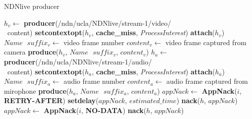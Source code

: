 \begin{algorithm}[ht]
\caption{NDNlive producer}
\label{alg:liveproducer}
\begin{algorithmic}[1]
\State $h_v \leftarrow $ \textbf{producer}(/ndn/ucla/NDNlive/stream-1/video/ \\\ content)
\State \textbf{setcontextopt}($h_v$, \textbf{cache\_miss}, \textit{ProcessInterest})
\State \textbf{attach}($h_v$)
\vspace{0.2cm}
	\State $Name \textbf{ } suffix_v \leftarrow $ video frame number
	\State $content_v \leftarrow $ video frame captured from camera
	\State \textbf{produce}($h_v$, $Name\textbf{ }suffix_v$, $content_v$)
	\EndWhile
\vspace{0.2cm}
\vspace{0.2cm}
\State $h_a \leftarrow $ \textbf{producer}(/ndn/ucla/NDNlive/stream-1/audio/ \\\  content)
\State \textbf{setcontextopt}($h_a$, \textbf{cache\_miss}, \textit{ProcessInterest})
\State \textbf{attach}($h_a$)
\vspace{0.2cm}
	\State $Name \textbf{ } suffix_a \leftarrow $ audio frame number
	\State $content_a \leftarrow $ audio frame captured from mirophone
	\State \textbf{produce}($h_a$, $Name\textbf{ }suffix_a$, $content_a$)
	\EndWhile
\vspace{0.4cm}
    \State $appNack \leftarrow $ \textbf{AppNack}($i$, \textbf{RETRY-AFTER})
    \State \textbf{setdelay}($appNack$, $estimated\_time$)
    \State \textbf{nack}($h$, $appNack$)
  \EndIf
    \State $appNack \leftarrow $ \textbf{AppNack}($i$, \textbf{NO-DATA})
    \State \textbf{nack}($h$, $appNack$)
  \EndIf
\EndFunction
\end{algorithmic}
\end{algorithm}

